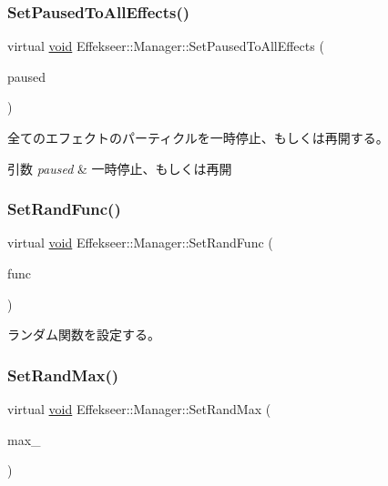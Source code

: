 \subsubsection{\texorpdfstring{Set\+Paused\+To\+All\+Effects()}{SetPausedToAllEffects()}}
{\footnotesize\ttfamily virtual \mbox{\hyperlink{namespace_effekseer_ab34c4088e512200cf4c2716f168deb56}{void}} Effekseer\+::\+Manager\+::\+Set\+Paused\+To\+All\+Effects (\begin{DoxyParamCaption}\item[{bool}]{paused }\end{DoxyParamCaption})\hspace{0.3cm}{\ttfamily [pure virtual]}}



全てのエフェクトのパーティクルを一時停止、もしくは再開する。 


\begin{DoxyParams}{引数}
{\em paused} & 一時停止、もしくは再開 \\
\hline
\end{DoxyParams}
\mbox{\label{class_effekseer_1_1_manager_acff5857772ae9674b6f96ffd4de28f69}} 
\subsubsection{\texorpdfstring{Set\+Rand\+Func()}{SetRandFunc()}}
{\footnotesize\ttfamily virtual \mbox{\hyperlink{namespace_effekseer_ab34c4088e512200cf4c2716f168deb56}{void}} Effekseer\+::\+Manager\+::\+Set\+Rand\+Func (\begin{DoxyParamCaption}\item[{Rand\+Func}]{func }\end{DoxyParamCaption})\hspace{0.3cm}{\ttfamily [pure virtual]}}



ランダム関数を設定する。 

\mbox{\label{class_effekseer_1_1_manager_ad2e4e1458d5e1091f5cb8073ae8e60eb}} 
\subsubsection{\texorpdfstring{Set\+Rand\+Max()}{SetRandMax()}}
{\footnotesize\ttfamily virtual \mbox{\hyperlink{namespace_effekseer_ab34c4088e512200cf4c2716f168deb56}{void}} Effekseer\+::\+Manager\+::\+Set\+Rand\+Max (\begin{DoxyParamCaption}\item[{\mbox{\hyperlink{namespace_effekseer_ace0abf7c2e6947e519ebe8b54cbcc30a}{int}}}]{max\+\_\+ }\end{DoxyParamCaption})\hspace{0.3cm}{\ttfamily [pure virtual]}}



